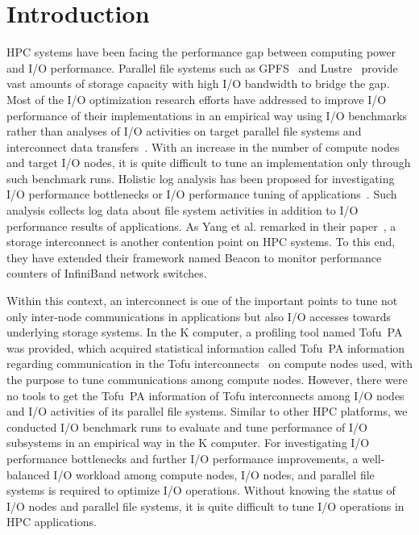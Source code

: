 \documentclass{jhps}
\begin{document}
\section{Introduction}
\label{sec:INTRO}

HPC systems have been facing the performance gap between computing power and I/O performance.
Parallel file systems such as GPFS~\cite{gpfs:usenix02} and Lustre~\cite{lustre:web} provide
vast amounts of storage capacity with high I/O bandwidth to bridge the gap.
Most of the I/O optimization research efforts have addressed to improve
I/O performance of their implementations in an empirical way using I/O benchmarks
rather than analyses of I/O activities on target parallel file systems
and interconnect
data transfers~\cite{behzad:sc13,bhimji:cug16,tessier:com-hpc16,vazhkudai:sc18,oral:sc19}.
With an increase in the number of compute nodes and target I/O nodes,
it is quite difficult to tune an implementation only through such benchmark runs.
Holistic log analysis has been proposed for investigating I/O performance bottlenecks
or I/O performance tuning
of applications~\cite{lockwood:cug18,wang:cluster18,yang:nsdi2019}.
Such analysis collects log data about file system activities in addition to
I/O performance results of applications.
As Yang et al. remarked in their paper~\cite{yang:nsdi2019},
a storage interconnect is another contention point on HPC systems.
To this end, they have extended their framework named Beacon
to monitor performance counters of InfiniBand network switches.

Within this context, an interconnect is one of the important points
to tune not only inter-node communications in applications
but also I/O accesses towards underlying storage systems.
In the K computer, a profiling tool named Tofu~PA~\cite{profiler:fujitsu-tech-si}
was provided, which acquired statistical information called Tofu~PA information
regarding communication in the Tofu interconnects~\cite{tofu:micro2012}
on compute nodes used, with the purpose to tune communications among compute nodes.
However, there were no tools to get the Tofu~PA information of Tofu interconnects
among I/O nodes and I/O activities of its parallel file systems.
Similar to other HPC platforms, we conducted I/O benchmark runs
to evaluate and tune performance of I/O subsystems in an empirical way
in the K computer.
For investigating I/O performance bottlenecks and further I/O performance improvements,
a well-balanced I/O workload among compute nodes, I/O nodes, and parallel file systems
is required to optimize I/O operations.
Without knowing the status of I/O nodes and parallel file systems,
it is quite difficult to tune I/O operations in HPC applications.
\end{document}
